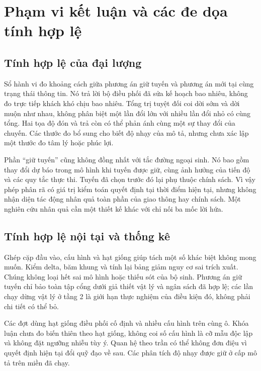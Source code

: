 \section{Phạm vi kết luận và các đe dọa tính hợp lệ}
\label{muc:hanche}

\subsection{Tính hợp lệ của đại lượng}

Sổ hành vi đo khoảng cách giữa phương án giữ tuyến và phương án mới tại cùng
trạng thái thông tin. Nó trả lời bộ điều phối đã sửa kế hoạch bao nhiêu,
không đo trực tiếp khách khó chịu bao nhiêu. Tổng trị tuyệt đối coi dời sớm
và dời muộn như nhau, không phân biệt một lần đổi lớn với nhiều lần đổi nhỏ
có cùng tổng. Hai tọa độ đón và trả còn có thể phản ánh cùng một sự thay
đổi của chuyến. Các thước đo bổ sung cho biết độ nhạy của mô tả, nhưng chưa
xác lập một thước đo tâm lý hoặc phúc lợi.

Phần ``giữ tuyến'' cũng không đồng nhất với tắc đường ngoại sinh. Nó bao
gồm thay đổi dự báo trong mô hình khi tuyến được giữ, cùng ảnh hưởng của
tiến độ và các quy tắc thực thi. Tuyến đã chọn trước đó lại phụ thuộc chính
sách. Vì vậy phép phân rã có giá trị kiểm toán quyết định tại thời điểm
hiện tại, nhưng không nhận diện tác động nhân quả toàn phần của giao thông
hay chính sách. Một nghiên cứu nhân quả cần một thiết kế khác với chỉ nối
ba mốc lời hứa.

\subsection{Tính hợp lệ nội tại và thống kê}

Ghép cặp đầu vào, cấu hình và hạt giống giúp tách một số khác biệt không
mong muốn. Kiểm delta, băm khung và tính lại bảng giảm nguy cơ sai trích
xuất. Chúng không loại hết sai mô hình hoặc thiếu sót của bộ sinh. Phương
án giữ tuyến chỉ bảo toàn tập cổng dưới giả thiết vật lý và ngân sách đã
hợp lệ; các lần chạy dừng vật lý ở tầng 2 là giới hạn thực nghiệm của
điều kiện đó, không phải chi tiết có thể bỏ.

Các đợt dùng hạt giống điều phối cố định và nhiều cấu hình trên cùng ô.
Khóa luận chưa đo biến thiên theo hạt giống, không coi số cấu hình là cỡ
mẫu độc lập và không đặt ngưỡng nhiễu tùy ý. Quan hệ theo trần có thể không
đơn điệu vì quyết định hiện tại đổi quỹ đạo về sau. Các phân tích độ nhạy
được giữ ở cấp mô tả trên miền đã chạy.

